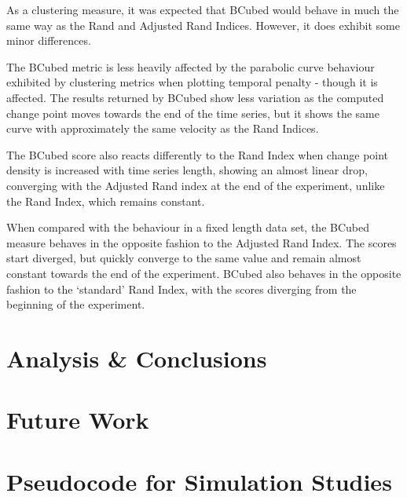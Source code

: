 \documentclass{uvamscse}	%
\begin{document}
As a clustering measure, it was expected that BCubed would behave in much the same way as the Rand and Adjusted Rand Indices. However, it does exhibit some minor differences.

The BCubed metric is less heavily affected by the parabolic curve behaviour exhibited by clustering metrics when plotting temporal penalty - though it is affected. The results returned by BCubed show less variation as the computed change point moves towards the end of the time series, but it shows the same curve with approximately the same velocity as the Rand Indices.

The BCubed score also reacts differently to the Rand Index when change point density is increased with time series length, showing an almost linear drop, converging with the Adjusted Rand index at the end of the experiment, unlike the Rand Index, which remains constant.

When compared with the behaviour in a fixed length data set, the BCubed measure behaves in the opposite fashion to the Adjusted Rand Index. The scores start diverged, but quickly converge to the same value and remain almost constant towards the end of the experiment. BCubed also behaves in the opposite fashion to the `standard' Rand Index, with the scores diverging from the beginning of the experiment.


\chapter{Analysis \& Conclusions}
\label{conclusions}


\chapter{Future Work}


\printbibliography

\appendix
{}

\chapter{Pseudocode for Simulation Studies}
\end{document}
